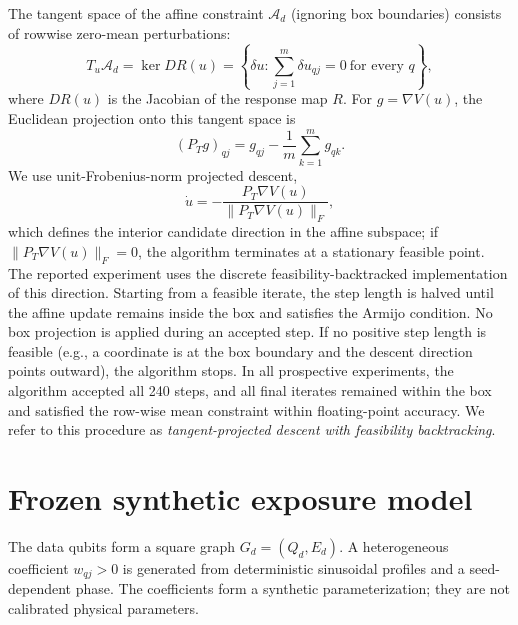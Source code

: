 \documentclass[11pt]{article}
\begin{document}
The tangent space of the affine constraint \(\mathcal A_d\) (ignoring box boundaries) consists of rowwise zero-mean perturbations:
\begin{equation}
  T_u \mathcal A_d=\ker DR(u)=\left\{\delta u:
  \sum_{j=1}^{m}\delta u_{qj}=0\ \text{for every }q\right\},
  \label{eq:tangent}
\end{equation}
where \(DR(u)\) is the Jacobian of the response map \(R\).
For \(g=\nabla V(u)\), the Euclidean projection onto this tangent space is
\begin{equation}
  (P_Tg)_{qj}=g_{qj}-\frac{1}{m}\sum_{k=1}^{m}g_{qk}.
  \label{eq:projection}
\end{equation}
We use unit-Frobenius-norm projected descent,
\begin{equation}
  \dot u=-\frac{P_T\nabla V(u)}{\|P_T\nabla V(u)\|_F},
  \label{eq:general-flow}
\end{equation}
which defines the interior candidate direction in the affine subspace; if \(\|P_T\nabla V(u)\|_F = 0\), the algorithm terminates at a stationary feasible point. The reported experiment uses the discrete feasibility-backtracked implementation of this direction. Starting from a feasible iterate, the step length is halved until the affine update remains inside the box and satisfies the Armijo condition. No box projection is applied during an accepted step. If no positive step length is feasible (e.g., a coordinate is at the box boundary and the descent direction points outward), the algorithm stops. In all prospective experiments, the algorithm accepted all 240 steps, and all final iterates remained within the box and satisfied the row-wise mean constraint within floating-point accuracy. We refer to this procedure as \emph{tangent-projected descent with feasibility backtracking}.

\section{Frozen synthetic exposure model}
\label{sec:exposure}

The data qubits form a square graph \(G_d=(Q_d,E_d)\). A heterogeneous coefficient \(w_{qj}>0\) is generated from deterministic sinusoidal profiles and a seed-dependent phase. The coefficients form a synthetic parameterization; they are not calibrated physical parameters.
\end{document}
